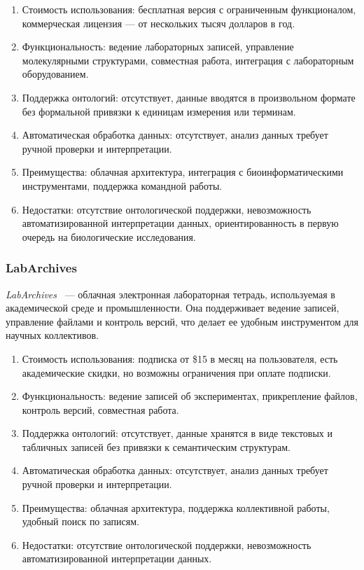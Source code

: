 \begin{enumerate}
    \item Стоимость использования: бесплатная версия с ограниченным функционалом, коммерческая лицензия — от нескольких тысяч долларов в год.
    \item Функциональность: ведение лабораторных записей, управление молекулярными структурами, совместная работа, интеграция с лабораторным оборудованием.
    \item Поддержка онтологий: отсутствует, данные вводятся в произвольном формате без формальной привязки к единицам измерения или терминам.
    \item Автоматическая обработка данных: отсутствует, анализ данных требует ручной проверки и интерпретации.
    \item Преимущества: облачная архитектура, интеграция с биоинформатическими инструментами, поддержка командной работы.
    \item Недостатки: отсутствие онтологической поддержки, невозможность автоматизированной интерпретации данных, ориентированность в первую очередь на биологические исследования.
\end{enumerate}

\subsubsection{LabArchives}

\textit{LabArchives}~\cite{ELN:LabArchives} — облачная электронная лабораторная тетрадь, используемая в академической среде и промышленности.
Она поддерживает ведение записей, управление файлами и контроль версий, что делает ее удобным инструментом для научных коллективов.

\begin{enumerate}
    \item Стоимость использования: подписка от \$15 в месяц на пользователя, есть академические скидки, но возможны ограничения при оплате подписки.
    \item Функциональность: ведение записей об экспериментах, прикрепление файлов, контроль версий, совместная работа.
    \item Поддержка онтологий: отсутствует, данные хранятся в виде текстовых и табличных записей без привязки к семантическим структурам.
    \item Автоматическая обработка данных: отсутствует, анализ данных требует ручной проверки и интерпретации.
    \item Преимущества: облачная архитектура, поддержка коллективной работы, удобный поиск по записям.
    \item Недостатки: отсутствие онтологической поддержки, невозможность автоматизированной интерпретации данных.
\end{enumerate}

